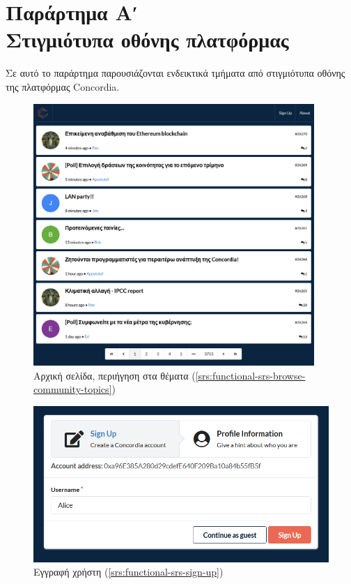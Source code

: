 \chapter*{Παράρτημα Αʹ\\[20pt]Στιγμιότυπα οθόνης πλατφόρμας}\label{appendix-a}


\captionsetup{labelformat=AppendixAFigures}
\setcounter{figure}{0}

Σε αυτό το παράρτημα παρουσιάζονται ενδεικτικά τμήματα από στιγμιότυπα οθόνης της πλατφόρμας Concordia.

\begin{figure}[H]
	\centering
	\includegraphics[width=0.95\textwidth]{assets/figures/appendix-a/screenshot-1-topics-screen}
	\caption{Αρχική σελίδα, περιήγηση στα θέματα (\ref{srs:functional-srs-browse-community-topics})}
\end{figure}

\begin{figure}[H]
	\centering
	\includegraphics[width=.9\textwidth]{assets/figures/appendix-a/screenshot-2-signup}
	\caption{Εγγραφή χρήστη (\ref{srs:functional-srs-sign-up})}
\end{figure}

